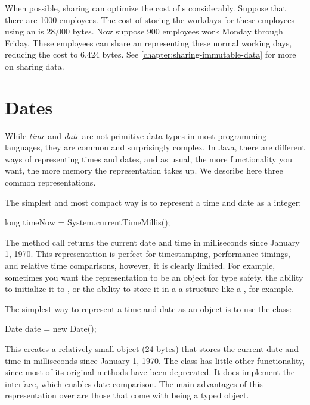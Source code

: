When possible, sharing can optimize the cost of 
 s considerably. Suppose
that there are 1000 employees. The cost of storing the workdays for these
employees using an  is 28,000 bytes. 
Now suppose 900 employees work Monday
through Friday. These employees can share an  representing
these normal working days, reducing the cost to 6,424 bytes.  See \autoref{chapter:sharing-immutable-data}
for more on sharing data.


\section{Dates}

While \textit{time} and \textit{date} are not primitive data types in most
programming languages, they are common and surprisingly complex. 
In Java, there are different ways of representing times and dates, and as
usual, the more functionality you want, the more memory the representation takes
up. We describe here three common representations.

The simplest and most compact way is to represent a time and date as a
 integer:
\begin{shortlisting}
    long timeNow = System.currentTimeMillis();
\end{shortlisting}
The method call  returns the current 
date and time in milliseconds since January 1, 1970.  This representation is
perfect for timestamping, performance timings, and relative time
comparisons, however, it is clearly limited. For example, sometimes you want the
representation to be an object for type safety, the ability to initialize it
to , or the ability to store it in a a structure like a
, for example.

The simplest way to represent a time and date as an object is to use the
 class:
\begin{shortlisting}
    Date date = new Date();
\end{shortlisting}
This creates a relatively small object (24 bytes) that stores the current date
and time in milliseconds since January 1, 1970. The class  has
little other functionality, since most of its original methods have been
deprecated. It does implement the  interface, which enables
date comparison. The main advantages of this representation over  are
those that come with being a typed object.



